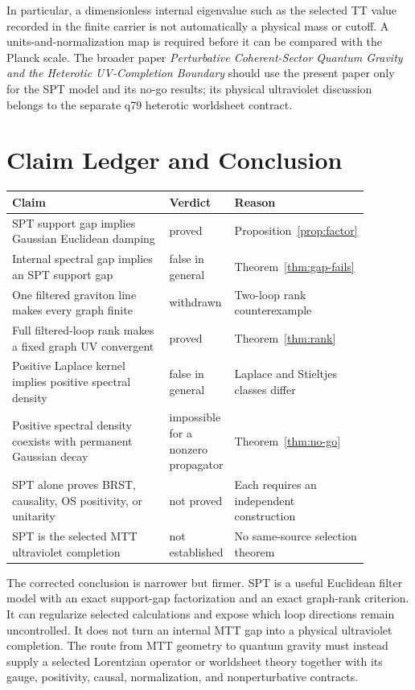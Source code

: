 \documentclass[11pt]{article}
\begin{document}
In particular, a dimensionless internal eigenvalue such as the selected TT
value recorded in the finite carrier is not automatically a physical mass or
cutoff. A units-and-normalization map is required before it can be compared
with the Planck scale. The broader paper \emph{Perturbative Coherent-Sector
Quantum Gravity and the Heterotic UV-Completion Boundary} should use the
present paper only for the SPT model and its no-go results; its physical
ultraviolet discussion belongs to the separate q79 heterotic worldsheet
contract.

\section{Claim Ledger and Conclusion}

\begin{center}
\begin{tabular}{p{0.47\linewidth}p{0.18\linewidth}p{0.23\linewidth}}
\toprule
Claim & Verdict & Reason\\
\midrule
SPT support gap implies Gaussian Euclidean damping & proved &
Proposition~\ref{prop:factor}\\
Internal spectral gap implies an SPT support gap & false in general &
Theorem~\ref{thm:gap-fails}\\
One filtered graviton line makes every graph finite & withdrawn &
Two-loop rank counterexample\\
Full filtered-loop rank makes a fixed graph UV convergent & proved &
Theorem~\ref{thm:rank}\\
Positive Laplace kernel implies positive spectral density & false in general &
Laplace and Stieltjes classes differ\\
Positive spectral density coexists with permanent Gaussian decay & impossible
for a nonzero propagator & Theorem~\ref{thm:no-go}\\
SPT alone proves BRST, causality, OS positivity, or unitarity & not proved &
Each requires an independent construction\\
SPT is the selected MTT ultraviolet completion & not established &
No same-source selection theorem\\
\bottomrule
\end{tabular}
\end{center}

The corrected conclusion is narrower but firmer. SPT is a useful Euclidean
filter model with an exact support-gap factorization and an exact graph-rank
criterion. It can regularize selected calculations and expose which loop
directions remain uncontrolled. It does not turn an internal MTT gap into a
physical ultraviolet completion. The route from MTT geometry to quantum
gravity must instead supply a selected Lorentzian operator or worldsheet
theory together with its gauge, positivity, causal, normalization, and
nonperturbative contracts.
\end{document}
